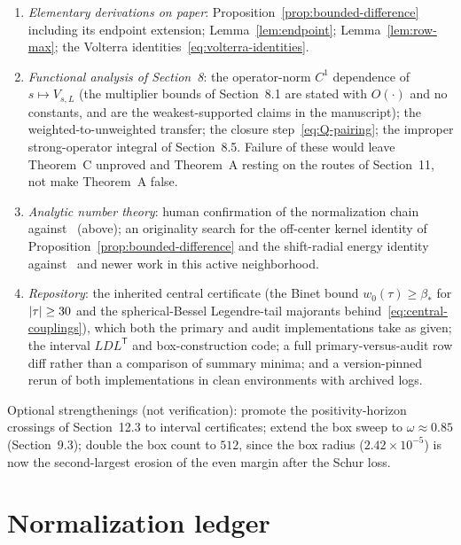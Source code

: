 \documentclass[11pt,a4paper]{article}
\DeclarePairedDelimiter{\abs}{\lvert}{\rvert}
\theoremstyle{plain}
\theoremstyle{definition}
\numberwithin{equation}{section}
\begin{document}
\begin{enumerate}[nosep,label=(\alph*)]
\item \emph{Elementary derivations on paper}: Proposition~\ref{prop:bounded-difference}
  including its endpoint extension; Lemma~\ref{lem:endpoint};
  Lemma~\ref{lem:row-max}; the Volterra identities~\eqref{eq:volterra-identities}.
\item \emph{Functional analysis of Section~8}: the operator-norm $C^1$
  dependence of $s\mapsto V_{s,L}$ (the multiplier bounds of Section~8.1 are
  stated with $O(\cdot)$ and no constants, and are the weakest-supported
  claims in the manuscript); the weighted-to-unweighted transfer; the
  closure step~\eqref{eq:Q-pairing}; the improper strong-operator integral
  of Section~8.5. Failure of these would leave Theorem~C unproved and
  Theorem~A resting on the routes of Section~11, not make Theorem~A false.
\item \emph{Analytic number theory}: human confirmation of the normalization
  chain against~\cite{Suzuki2012} (above); an originality search for the
  off-center kernel identity of Proposition~\ref{prop:bounded-difference} and
  the shift-radial energy identity against~\cite{ConnesConsani2020,Zhu2026,Kim2026,Groskin2026}
  and newer work in this active neighborhood.
\item \emph{Repository}: the inherited central certificate (the Binet bound
  $w_0(\tau)\ge\beta_*$ for $\abs\tau\ge30$ and the spherical-Bessel
  Legendre-tail majorants behind~\eqref{eq:central-couplings}), which both the
  primary and audit implementations take as given; the interval
  $LDL^{\mathsf T}$ and box-construction code; a full primary-versus-audit row
  diff rather than a comparison of summary minima; and a version-pinned rerun
  of both implementations in clean environments with archived logs.
\end{enumerate}
Optional strengthenings (not verification): promote the positivity-horizon
crossings of Section~12.3 to interval certificates; extend the box sweep to
$\omega\approx0.85$ (Section~9.3); double the box count to $512$, since the
box radius ($2.42\times10^{-5}$) is now the second-largest erosion of the even
margin after the Schur loss.

\appendix
\section{Normalization ledger}
\end{document}
